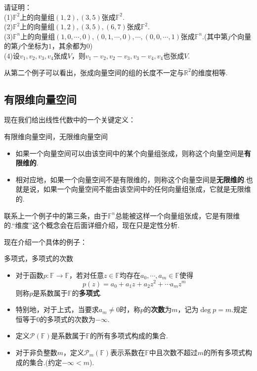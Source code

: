 \documentclass[lang=cn, zihao=5]{elegantbook}
\newcommand{\R}{\mathbb{R}}
\newcommand{\F}{\mathbb{F}}
\begin{document}
\begin{example}
	请证明： \\
	(1)$\F ^{2}$上的向量组$(1,2),(3,5)$张成$\F ^{2}$. \\
	(2)$\F ^{2}$上的向量组$(1,2),(3,5),(6,7)$张成$\F ^{2}$. \\
	(3)$\F ^{n}$上的向量组$(1,0,\cdots ,0),(0,1,\cdots ,0),\cdots , (0,0, \cdots ,1)$张成$\F ^{n}$.(其中第$j$个向量的第$j$个坐标为$1$，其余都为$0$) \\
	(4)设$v_1,v_2,v_3,v_4$张成$V$，则$v_1-v_2,v_2-v_3,v_3-v_4,v_4$也张成$V$.
\end{example}
\begin{remark}
	从第二个例子可以看出，张成向量空间的组的长度不一定与$\R ^2$的维度相等.
\end{remark}

\subsection{有限维向量空间}

现在我们给出线性代数中的一个关键定义：

\begin{definition}{有限维向量空间，无限维向量空间}
	\begin{itemize}
		\item 如果一个向量空间可以由该空间中的某个向量组张成，则称这个向量空间是\textbf{有限维的}.
		\item 相对应地，如果一个向量空间不是有限维的，则称这个向量空间是\textbf{无限维的}.也就是说，如果一个向量空间不能由该空间中的任何向量组张成，它就是无限维的.
	\end{itemize}
\end{definition}

联系上一个例子中的第三条，由于$\F ^{n}$总能被这样一个向量组张成，它是有限维的.“维度”这个概念会在后面详细介绍，现在只是定性分析.

现在介绍一个具体的例子：

\begin{definition}{多项式，多项式的次数}
	\begin{itemize}
		\item 对于函数$p:\F \to \F$，若对任意$z \in \F$均存在$a_0, \cdots ,a_m \in \F$使得$$p(z) = a_0 + a_1z + a_2z^2 + \cdots a_mz^m$$
		则称$p$是系数属于$\F$的\textbf{多项式}.
		\item 特别地，对于上式，当要求$a_m \neq 0$时，称$p$的\textbf{次数}为$m$，记为$\deg p = m$.规定恒等于$0$的多项式的次数为$-\infty$.
		\item 定义$\mathcal{P} (\F)$是系数属于$\F$的所有多项式构成的集合.
		\item 对于非负整数$m$，定义$\mathcal{P}_{m} (\F)$表示系数在$\F$中且次数不超过$m$的所有多项式构成的集合.(约定$-\infty < m$).
	\end{itemize}
\end{definition}
\end{document}
